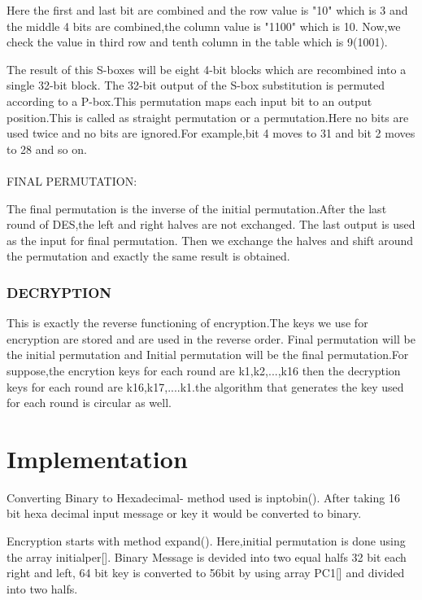 \documentclass[11pt]{article}
\begin{document}
\quad\quad Here the first and last bit are combined and the row value is "10" which is 3 and the middle 4 bits are combined,the column value is "1100" which is 10.
Now,we check the value in third row and tenth column in the table which is 9(1001).

\quad\quad The result of this S-boxes will be eight 4-bit blocks which are recombined into a single 32-bit block.
    The 32-bit output of the S-box substitution is permuted according to a P-box.This permutation maps each input bit to an output position.This is called as straight permutation 
 or a permutation.Here no bits are used twice and no bits are ignored.For example,bit 4 moves to 31 and bit 2 moves to 28 and so on.\\
\\FINAL PERMUTATION:

\quad\quad The final permutation is the inverse of the initial permutation.After the last round of DES,the left and right halves are not exchanged.
The last output is used as the input for final permutation.
Then we exchange the halves and shift around the permutation and exactly the same result is obtained.

 
\subsubsection{DECRYPTION}
  \qquad\quad This is exactly the reverse functioning of encryption.The keys we use for encryption are stored and are used in the reverse order.
  Final permutation will be the initial permutation and Initial permutation will be the final permutation.For suppose,the encrytion keys for each round are k1,k2,...,k16 then
the decryption keys for each round are k16,k17,....k1.the algorithm that generates the key used for each round is circular as well.

\section{Implementation}

\quad\quad Converting Binary to Hexadecimal- method used is inptobin().
After taking 16 bit hexa decimal input message or key it would be converted to binary.

Encryption starts with  method expand().
Here,initial permutation is done using the array initialper[].
Binary Message is devided into two equal halfs 32 bit each right and left,
64 bit key is converted to 56bit by using array PC1[] and divided into two halfs.
\end{document}
